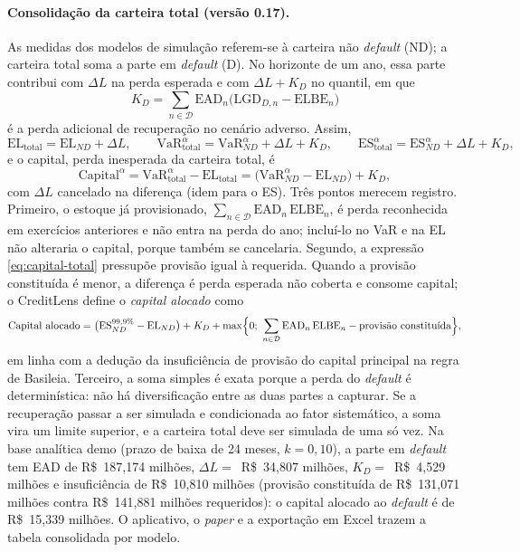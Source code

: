 \documentclass[11pt,a4paper]{article}
\newcommand{\VaR}{\mathrm{VaR}}
\newcommand{\ES}{\mathrm{ES}}
\begin{document}
\paragraph{Consolidação da carteira total (versão 0.17).} As medidas dos modelos de simulação referem-se à carteira não \emph{default} (ND); a carteira total soma a parte em \emph{default} (D). No horizonte de um ano, essa parte contribui com $\Delta L$ na perda esperada e com $\Delta L+K_D$ no quantil, em que
\begin{equation}
K_D=\sum_{n\in\mathcal D}\mathrm{EAD}_n\bigl(\mathrm{LGD}_{D,n}-\mathrm{ELBE}_n\bigr)
\label{eq:kd}
\end{equation}
é a perda adicional de recuperação no cenário adverso. Assim,
\begin{equation}
\mathrm{EL}_{\mathrm{total}}=\mathrm{EL}_{ND}+\Delta L,\qquad
\VaR^{\alpha}_{\mathrm{total}}=\VaR^{\alpha}_{ND}+\Delta L+K_D,\qquad
\ES^{\alpha}_{\mathrm{total}}=\ES^{\alpha}_{ND}+\Delta L+K_D,
\label{eq:consol}
\end{equation}
e o capital, perda inesperada da carteira total, é
\begin{equation}
\mathrm{Capital}^{\alpha}=\VaR^{\alpha}_{\mathrm{total}}-\mathrm{EL}_{\mathrm{total}}=\bigl(\VaR^{\alpha}_{ND}-\mathrm{EL}_{ND}\bigr)+K_D,
\label{eq:capital-total}
\end{equation}
com $\Delta L$ cancelado na diferença (idem para o ES). Três pontos merecem registro. Primeiro, o estoque já provisionado, $\sum_{n\in\mathcal D}\mathrm{EAD}_n\,\mathrm{ELBE}_n$, é perda reconhecida em exercícios anteriores e não entra na perda do ano; incluí-lo no VaR e na EL não alteraria o capital, porque também se cancelaria. Segundo, a expressão \eqref{eq:capital-total} pressupõe provisão igual à requerida. Quando a provisão constituída é menor, a diferença é perda esperada não coberta e consome capital; o CreditLens define o \emph{capital alocado} como
\begin{equation}
\mathrm{Capital\ alocado}=\bigl(\ES^{99{,}9\%}_{ND}-\mathrm{EL}_{ND}\bigr)+K_D+\max\Bigl\{0;\ \sum_{n\in\mathcal D}\mathrm{EAD}_n\,\mathrm{ELBE}_n-\text{provisão constituída}\Bigr\},
\label{eq:capital-alocado}
\end{equation}
em linha com a dedução da insuficiência de provisão do capital principal na regra de Basileia. Terceiro, a soma simples é exata porque a perda do \emph{default} é determinística: não há diversificação entre as duas partes a capturar. Se a recuperação passar a ser simulada e condicionada ao fator sistemático, a soma vira um limite superior, e a carteira total deve ser simulada de uma só vez. Na base analítica demo (prazo de baixa de 24 meses, $k=0{,}10$), a parte em \emph{default} tem EAD de R\$~187{,}174 milhões, $\Delta L=$~R\$~34{,}807 milhões, $K_D=$~R\$~4{,}529 milhões e insuficiência de R\$~10{,}810 milhões (provisão constituída de R\$~131{,}071 milhões contra R\$~141{,}881 milhões requeridos): o capital alocado ao \emph{default} é de R\$~15{,}339 milhões. O aplicativo, o \emph{paper} e a exportação em Excel trazem a tabela consolidada por modelo.
\end{document}
